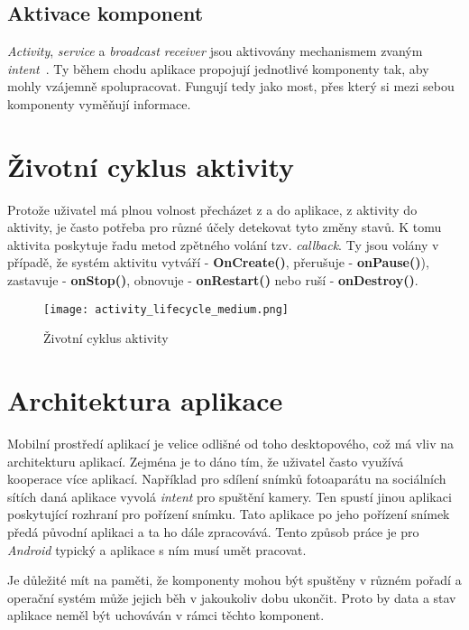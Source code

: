     \subsection{Aktivace komponent}
    \emph{Activity}, \emph{service} a \emph{broadcast receiver} jsou aktivovány mechanismem zvaným \emph{intent}~. Ty během chodu aplikace propojují jednotlivé komponenty tak, aby mohly vzájemně spolupracovat. Fungují tedy jako most, přes který si mezi sebou komponenty vyměňují informace.

\newpage
\section{Životní cyklus aktivity}
Protože uživatel má plnou volnost přecházet z a do aplikace, z aktivity do aktivity, je často potřeba pro různé účely detekovat tyto změny stavů. K tomu aktivita poskytuje řadu metod zpětného volání tzv. \emph{callback}. Ty jsou volány v případě, že systém aktivitu vytváří - \textbf{OnCreate()}, přerušuje - \textbf{onPause()}), zastavuje - \textbf{onStop()}, obnovuje - \textbf{onRestart()} nebo ruší - \textbf{onDestroy()}.

\begin{figure}[h!]
    \centering
    \vspace{0.5cm}
    \texttt{[image: activity\_lifecycle\_medium.png]}
    \caption[Životní cyklus aktivity]{Životní cyklus aktivity~\cite{activity-life-cycle}}
    \label{diagram:activity_lifecycle}
\end{figure}

\newpage
\section{Architektura aplikace}
 Mobilní prostředí aplikací je velice odlišné od toho desktopového, což má vliv na architekturu aplikací. Zejména je to dáno tím, že uživatel často využívá kooperace více aplikací. Například pro sdílení snímků fotoaparátu na sociálních sítích daná aplikace vyvolá \emph{intent} pro spuštění kamery. Ten spustí jinou aplikaci poskytující rozhraní pro pořízení snímku. Tato aplikace po jeho pořízení snímek předá původní aplikaci a ta ho dále zpracovává. Tento způsob práce je pro \emph{Android} typický a aplikace s ním musí umět pracovat.

 Je důležité mít na paměti, že komponenty mohou být spuštěny v různém pořadí a operační systém může jejich běh v jakoukoliv dobu ukončit. Proto by data a stav aplikace neměl být uchováván v rámci těchto komponent.
 
